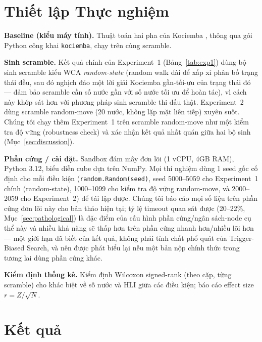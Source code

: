 \documentclass[10pt,conference]{article}
\begin{document}
\section{Thiết lập Thực nghiệm}
\label{sec:setup}

\textbf{Baseline (kiểu máy tính).} Thuật toán hai pha của Kociemba
\citep{kociemba}, thông qua gói Python công khai \texttt{kociemba},
chạy trên cùng scramble.

\textbf{Sinh scramble.} Kết quả chính của Experiment~1
(Bảng~\ref{tab:exp1}) dùng bộ sinh scramble kiểu WCA
\emph{random-state} (random walk dài để xấp xỉ phân bố trạng thái
đều, sau đó nghịch đảo một lời giải Kociemba gần-tối-ưu của trạng
thái đó --- đảm bảo scramble cần số nước gần với số nước tối ưu để
hoàn tác), vì cách này khớp sát hơn với phương pháp sinh scramble thi
đấu thật. Experiment~2 dùng scramble random-move (20 nước, không lặp
mặt liên tiếp) xuyên suốt. Chúng tôi chạy thêm Experiment~1 trên
scramble random-move như một kiểm tra độ vững (robustness check) và
xác nhận kết quả nhất quán giữa hai bộ sinh (Mục~\ref{sec:discussion}).

\textbf{Phần cứng / cài đặt.} Sandbox đám mây đơn lõi (1 vCPU, 4GB
RAM), Python 3.12, biểu diễn cube dựa trên NumPy. Mọi thí nghiệm dùng
1 seed gốc cố định cho mỗi điều kiện (\texttt{random.Random(seed)},
seed 5000--5059 cho Experiment~1 chính (random-state), 1000--1099 cho
kiểm tra độ vững random-move, và 2000--2059 cho Experiment~2) để tái
lập được. Chúng tôi báo cáo mọi số liệu trên phần cứng đơn lõi này cho
bản thảo hiện tại; tỷ lệ timeout quan sát được (20--22\%,
Mục~\ref{sec:pathological}) là đặc điểm của cấu hình phần cứng/ngân
sách-node cụ thể này và nhiều khả năng sẽ thấp hơn trên phần cứng
nhanh hơn/nhiều lõi hơn --- một giới hạn đã biết của kết quả, không
phải tính chất phổ quát của Trigger-Biased Search, và nên được phát
biểu lại nếu một bản nộp chính thức trong tương lai dùng phần cứng
khác.

\textbf{Kiểm định thống kê.} Kiểm định Wilcoxon signed-rank (theo cặp,
từng scramble) cho khác biệt về số nước và HLI giữa các điều kiện; báo
cáo effect size $r = Z/\sqrt{N}$.

\section{Kết quả}
\label{sec:results}
\end{document}
